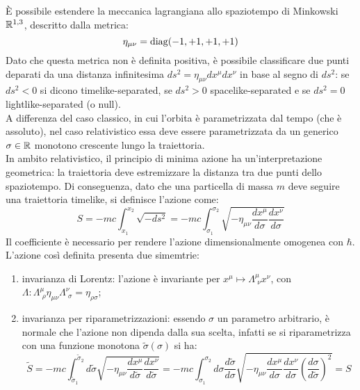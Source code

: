 È possibile estendere la meccanica lagrangiana allo spaziotempo di Minkowski $ \mathbb{R}^{1,3} $, descritto dalla metrica:
\begin{equation}
  \eta_{\mu \nu} = \operatorname{diag}(-1,+1,+1,+1)
  \label{eq:1.10}
\end{equation}
Dato che questa metrica non è definita positiva, è possibile classificare due punti deparati da una distanza infinitesima $ ds^2 = \eta_{\mu \nu} dx^{\mu} dx^{\nu} $ in base al segno di $ ds^2 $: se $ ds^2 < 0 $ si dicono timelike-separated, se $ ds^2 > 0 $ spacelike-separated e se $ ds^2 = 0 $ lightlike-separated (o null).\\
A differenza del caso classico, in cui l'orbita è parametrizzata dal tempo (che è assoluto), nel caso relativistico essa deve essere parametrizzata da un generico $ \sigma \in \mathbb{R} $ monotono crescente lungo la traiettoria.\\
In ambito relativistico, il principio di minima azione ha un'interpretazione geometrica: la traiettoria deve estremizzare la distanza tra due punti dello spaziotempo. Di conseguenza, dato che una particella di massa $ m $ deve seguire una traiettoria timelike, si definisce l'azione come:
\begin{equation}
  S = -mc \int_{x_1}^{x_2} \sqrt{-ds^2} = -mc \int_{\sigma_1}^{\sigma_2} \sqrt{-\eta_{\mu \nu} \frac{dx^{\mu}}{d\sigma} \frac{dx^{\nu}}{d\sigma}}
  \label{eq:1.11}
\end{equation}
Il coefficiente è necessario per rendere l'azione dimensionalmente omogenea con $ \hbar $.\\
L'azione così definita presenta due simemtrie:
\begin{enumerate}
  \item invarianza di Lorentz: l'azione è invariante per $ x^{\mu} \mapsto \Lambda^{\mu}_{\,\,\nu} x^{\nu} $, con $ \Lambda : \Lambda^{\mu}_{\,\,\rho} \eta_{\mu \nu} \Lambda^{\nu}_{\,\,\sigma} = \eta_{\rho \sigma} $;
  \item invarianza per riparametrizzazioni: essendo $ \sigma $ un parametro arbitrario, è normale che l'azione non dipenda dalla sua scelta, infatti se si riparametrizza con una funzione monotona $ \tilde{\sigma}(\sigma) $ si ha:
    \begin{equation}
      \tilde{S} = -mc \int_{\tilde{\sigma}_1}^{\tilde{\sigma}_2} d\tilde{\sigma} \sqrt{- \eta_{\mu \nu} \frac{dx^{\mu}}{d\tilde{\sigma}} \frac{dx^{\nu}}{d\tilde{\sigma}}} = -mc \int_{\sigma_1}^{\sigma_2} d\sigma \frac{d\tilde{\sigma}}{d\sigma} \sqrt{- \eta_{\mu \nu} \frac{dx^{\mu}}{d\sigma} \frac{dx^{\nu}}{d\sigma} \left( \frac{d\sigma}{d\tilde{\sigma}} \right)^2} = S
      \label{eq:1.12}
    \end{equation}
\end{enumerate}

